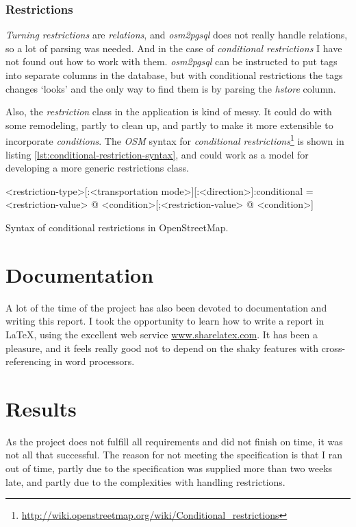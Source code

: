 \documentclass[../main.tex]{subfiles}
\begin{document}
\subsubsection{Restrictions}
\textit{Turning restrictions} are \textit{relations}, and \textit{osm2pgsql} does not really handle relations, so a lot of parsing was needed. And in the case of \textit{conditional restrictions} I have not found out how to work with them. \textit{osm2pgsql} can be instructed to put tags into separate columns in the database, but with conditional restrictions the tags changes `looks' and the only way to find them is by parsing the \textit{hstore} column. 

Also, the \textit{restriction} class in the application is kind of messy. It could do with some remodeling, partly to clean up, and partly to make it more extensible to incorporate \textit{conditions}. The \textit{OSM} syntax for \textit{conditional restrictions}\footnote{\url{http://wiki.openstreetmap.org/wiki/Conditional_restrictions}} is shown in listing \ref{lst:conditional-restriction-syntax}, and could work as a model for developing a more generic restrictions class.

\begin{mylisting}
\begin{textcode}
<restriction-type>[:<transportation mode>][:<direction>]:conditional
  = <restriction-value> @ <condition>[;<restriction-value> @ <condition>]
\end{textcode}
\caption{Syntax of conditional restrictions in OpenStreetMap.}
\label{lst:conditional-restriction-syntax}
\end{mylisting}

\section{Documentation}
A lot of the time of the project has also been devoted to documentation and writing this report. I took the opportunity to learn how to write a report in \LaTeX, using the excellent web service \url{www.sharelatex.com}. It has been a pleasure, and it feels really good not to depend on the shaky features with cross-referencing in word processors.

\section{Results}
As the project does not fulfill all requirements and did not finish on time, it was not all that successful. The reason for not meeting the specification is that I ran out of time, partly due to the specification was supplied more than two weeks late, and partly due to the complexities with handling restrictions.
\end{document}
